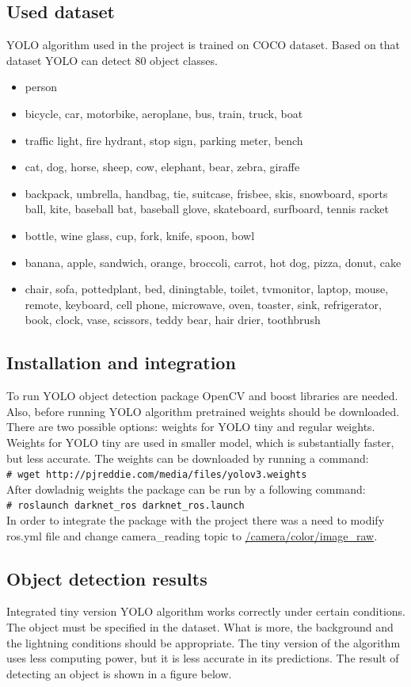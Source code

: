 \documentclass[conference,a4paper]{IEEEtran}
\newcommand{\shellcmd}[1]{\\\texttt{\footnotesize\# #1}\\}
\begin{document}
\subsection{Used dataset}
YOLO algorithm used in the project is trained on COCO dataset. Based on that dataset YOLO can detect 80 object classes.
\begin{itemize}
\item person
\item bicycle, car, motorbike, aeroplane, bus, train, truck, boat
\item traffic light, fire hydrant, stop sign, parking meter, bench
\item cat, dog, horse, sheep, cow, elephant, bear, zebra, giraffe
\item backpack, umbrella, handbag, tie, suitcase, frisbee, skis, snowboard, sports ball, kite, baseball bat, baseball glove, skateboard, surfboard, tennis racket
\item bottle, wine glass, cup, fork, knife, spoon, bowl
\item banana, apple, sandwich, orange, broccoli, carrot, hot dog, pizza, donut, cake
\item chair, sofa, pottedplant, bed, diningtable, toilet, tvmonitor, laptop, mouse, remote, keyboard, cell phone, microwave, oven, toaster, sink, refrigerator, book, clock, vase, scissors, teddy bear, hair drier, toothbrush
\end{itemize}

\subsection{Installation and integration}
To run YOLO object detection package OpenCV and boost libraries are needed. Also, before running YOLO algorithm pretrained weights should be downloaded. There are two possible options: weights for YOLO tiny and regular weights. Weights for YOLO tiny are used in smaller model, which is substantially faster, but less accurate. The weights can be downloaded by running a command:
\shellcmd{wget http://pjreddie.com/media/files/yolov3.weights}
After dowladnig weights the package can be run by a following command:
\shellcmd{roslaunch darknet\_ros darknet\_ros.launch}
In order to integrate the package with the project there was a need to modify ros.yml file and change camera\_reading topic to \url{/camera/color/image_raw}.

\subsection{Object detection results}
Integrated tiny version YOLO algorithm works correctly under certain conditions. The object must be specified in the dataset. What is more, the background and the lightning conditions should be appropriate. The tiny version of the algorithm uses less computing power, but it is less accurate in its predictions. The result of detecting an object is shown in a figure below. 
\end{document}

